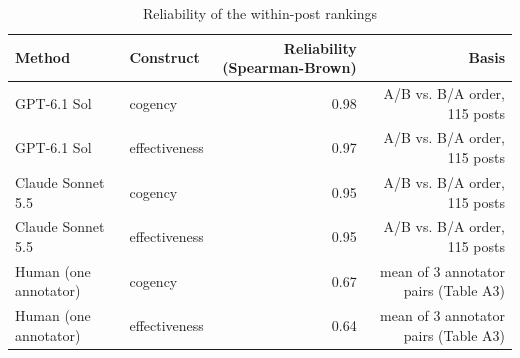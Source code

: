 \begin{table}[htbp]
\centering
\small
\caption{Reliability of the within-post rankings}
\label{tab:B0_reliability}
\begin{tabular}{llrr}
\toprule
Method & Construct & Reliability (Spearman-Brown) & Basis \\
\midrule
GPT-6.1 Sol & cogency & 0.98 & A/B vs. B/A order, 115 posts \\
GPT-6.1 Sol & effectiveness & 0.97 & A/B vs. B/A order, 115 posts \\
Claude Sonnet 5.5 & cogency & 0.95 & A/B vs. B/A order, 115 posts \\
Claude Sonnet 5.5 & effectiveness & 0.95 & A/B vs. B/A order, 115 posts \\
Human (one annotator) & cogency & 0.67 & mean of 3 annotator pairs (Table A3) \\
Human (one annotator) & effectiveness & 0.64 & mean of 3 annotator pairs (Table A3) \\
\bottomrule
\end{tabular}
\end{table}
